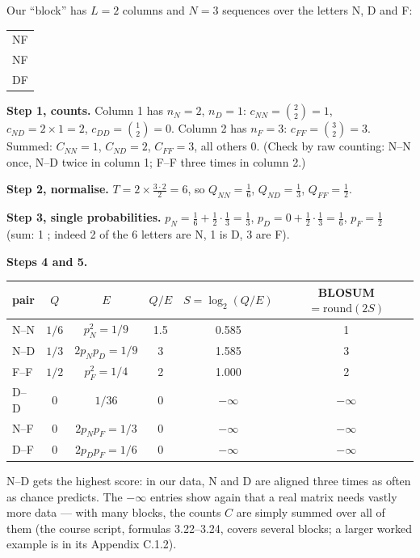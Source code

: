\documentclass[11pt, oneside]{book}
\makeatletter
\newcommand{\alnblock}[1]{%
  \par\smallskip
  {\centering\ttfamily\small
   \begin{tabular}{@{}l@{}}#1\end{tabular}\par}%
  \smallskip}
\makeatother
\begin{document}
\begin{exbox}[title={A complete BLOSUM from a tiny block}]
Our ``block'' has $L = 2$ columns and $N = 3$ sequences over the letters N, D
and F:
\alnblock{%
NF\\
NF\\
DF}

\textbf{Step 1, counts.} Column 1 has $n_N = 2$, $n_D = 1$:
$c_{NN} = \binom{2}{2} = 1$, $c_{ND} = 2 \times 1 = 2$, $c_{DD} = \binom{1}{2} = 0$.
Column 2 has $n_F = 3$: $c_{FF} = \binom{3}{2} = 3$. Summed:
$C_{NN} = 1$, $C_{ND} = 2$, $C_{FF} = 3$, all others 0. (Check by raw
counting: N--N once, N--D twice in column 1; F--F three times in column 2.)

\textbf{Step 2, normalise.} $T = 2 \times \frac{3 \cdot 2}{2} = 6$, so
$Q_{NN} = \tfrac16$, $Q_{ND} = \tfrac13$, $Q_{FF} = \tfrac12$.

\textbf{Step 3, single probabilities.}
$p_N = \tfrac16 + \tfrac12 \cdot \tfrac13 = \tfrac13$,\;
$p_D = 0 + \tfrac12 \cdot \tfrac13 = \tfrac16$,\;
$p_F = \tfrac12$ (sum: 1 \checkmark; indeed 2 of the 6 letters are N, 1 is D,
3 are F).

\textbf{Steps 4 and 5.}
\begin{center}
\small
\begin{tabular}{@{}lccccc@{}}
\toprule
pair & $Q$ & $E$ & $Q/E$ & $S = \log_2(Q/E)$ & BLOSUM $= \mathrm{round}(2S)$ \\
\midrule
N--N & $1/6$ & $p_N^2 = 1/9$            & 1.5 & 0.585 & 1 \\
N--D & $1/3$ & $2p_Np_D = 1/9$          & 3   & 1.585 & 3 \\
F--F & $1/2$ & $p_F^2 = 1/4$            & 2   & 1.000 & 2 \\
D--D & 0     & $1/36$                   & 0   & $-\infty$ & $-\infty$ \\
N--F & 0     & $2p_Np_F = 1/3$          & 0   & $-\infty$ & $-\infty$ \\
D--F & 0     & $2p_Dp_F = 1/6$          & 0   & $-\infty$ & $-\infty$ \\
\bottomrule
\end{tabular}
\end{center}
N--D gets the highest score: in our data, N and D are aligned three times as
often as chance predicts. The $-\infty$ entries show again that a real matrix
needs vastly more data --- with many blocks, the counts $C$ are simply summed
over all of them (the course script, formulas 3.22--3.24, covers several
blocks; a larger worked example is in its Appendix C.1.2).
\end{exbox}
\end{document}
